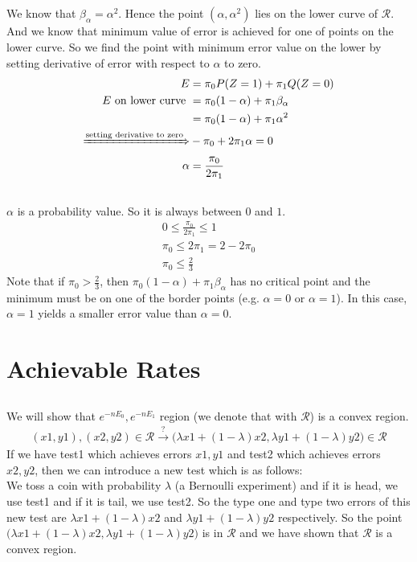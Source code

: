 \documentclass{article}
\numberwithin{equation}{section}
\begin{document}
\subsection{}
We know that \(\beta_\alpha = \alpha^2\). Hence the point \((\alpha, \alpha^2)\) lies on the lower curve of \(\mathcal{R}\).
And we know that minimum value of error is achieved for one of points on the lower curve.
So we find the point with minimum error value on the lower by setting derivative of error with respect to \(\alpha\) to zero.
\begin{align}
E &= \pi_0P(Z=1) + \pi_1 Q(Z=0)\\
E \text{ on lower curve } &= \pi_0 (1-\alpha) + \pi_1 \beta_\alpha\\
&= \pi_0 (1-\alpha) + \pi_1 \alpha^2\\
\xRightarrow{\text{setting derivative to zero}}& - \pi_0 + 2\pi_1 \alpha = 0\\
\alpha &= \frac{\pi_0}{2\pi_1}
\end{align}

\subsection{}
\(\alpha\) is a probability value. So it is always between \(0\) and \(1\).
\begin{gather}
0 \le \frac{\pi_0}{2\pi_1} \le 1\\
\pi_0 \le 2\pi_1 = 2 - 2\pi_0\\
\pi_0 \le \frac{2}{3}
\end{gather}
Note that  if \(\pi_0 > \frac{2}{3}\), then \(\pi_0 (1-\alpha) + \pi_1 \beta_\alpha\) has no critical point and the minimum must be on one of the border points (e.g. \(\alpha = 0 \text{ or } \alpha = 1\)).
In this case, \(\alpha = 1\) yields a smaller error value than \(\alpha = 0\).

\section{Achievable Rates}
\subsection{}
We will show that \(e^{-nE_0}, e^{-nE_1}\) region (we denote that with \(\mathcal{R}\)) is a convex region.
\begin{align}
(x1, y1), (x2, y2) \in \mathcal{R} \xrightarrow{?} \Big(\lambda x1 + (1-\lambda)x2, \lambda y1 + (1-\lambda)y2\Big) \in \mathcal{R}
\end{align}
If we have test1 which achieves errors \(x1, y1\) and test2 which achieves errors \(x2, y2\), then we can introduce a new test which is as follows:\\
We toss a coin with probability \(\lambda\) (a Bernoulli experiment) and if it is head, we use test1 and if it is tail, we use test2.
So the type one and type two errors of this new test are \(\lambda x1 + (1-\lambda)x2\) and \( \lambda y1 + (1-\lambda)y2\) respectively.
So the point \(\Big(\lambda x1 + (1-\lambda)x2, \lambda y1 + (1-\lambda)y2\Big)\) is in \(\mathcal{R}\) and we have shown that \(\mathcal{R}\) is a convex region.
\end{document}
